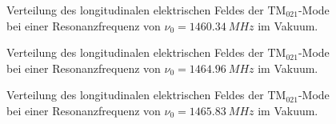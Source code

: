 \begin{figure}[p]
	\centering
	
	\caption[Feldverteilung der $\mathrm{TM}_{021}$-Mode \mbox{$\nu_0 = \SI{1460.34}{MHz}$}]{Verteilung des longitudinalen elektrischen Feldes der $\mathrm{TM}_{021}$-Mode bei einer Resonanzfrequenz von \mbox{$\nu_0 = \SI{1460.34}{MHz}$} im Vakuum.}
	\label{fig:tm021_1460}
    
    
    \caption[Feldverteilung der $\mathrm{TM}_{021}$-Mode \mbox{$\nu_0 = \SI{1464.96}{MHz}$}]{Verteilung des longitudinalen elektrischen Feldes der $\mathrm{TM}_{021}$-Mode bei einer Resonanzfrequenz von \mbox{$\nu_0 = \SI{1464.96}{MHz}$} im Vakuum.}
\end{figure}


\begin{figure}[p]
  \centering
  
  \caption[Feldverteilung der $\mathrm{TM}_{021}$-Mode \mbox{$\nu_0 = \SI{1465.83}{MHz}$}]{Verteilung des longitudinalen elektrischen Feldes der $\mathrm{TM}_{021}$-Mode bei einer Resonanzfrequenz von \mbox{$\nu_0 = \SI{1465.83}{MHz}$} im Vakuum.}
\end{figure}


\FloatBarrier